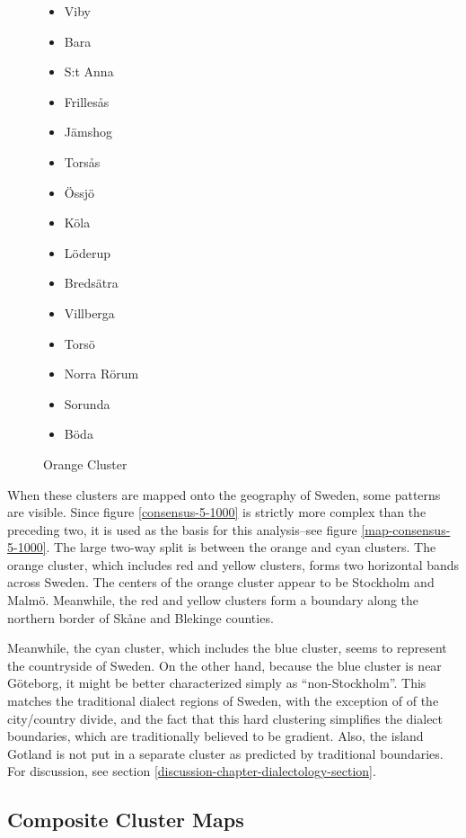 \begin{figure}
\begin{itemize}
\item Viby
\item Bara
\item S:t Anna
\item Frilles\aa{}s
\item J\"amshog
\item Tors\aa{}s
\item \"Ossj\"o
\item K\"ola
\item L\"oderup
\item Breds\"atra
\item Villberga
\item Tors\"o
\item Norra R\"orum
\item Sorunda
\item B\"oda
\end{itemize}
\caption{Orange Cluster}
\label{orange-cluster}
\end{figure}

When these clusters are mapped onto the geography of Sweden, some
patterns are visible. Since figure \ref{consensus-5-1000} is strictly
more complex than the preceding two, it is used as the basis for this
analysis--see figure \ref{map-consensus-5-1000}. The large two-way split
is between the orange and cyan clusters. The orange cluster, which
includes red and yellow clusters, forms two horizontal bands across
Sweden. The centers of the orange cluster appear to be Stockholm and
Malm\"o. Meanwhile, the red and yellow clusters form a boundary along
the northern border of Sk\aa{}ne and Blekinge counties.

Meanwhile, the cyan cluster, which includes the blue cluster, seems to
represent the countryside of Sweden. On the other hand, because the
blue cluster is near G\"oteborg, it might be better characterized
simply as ``non-Stockholm''. This matches the traditional dialect
regions of Sweden, with the exception of of the city/country divide,
and the fact that this hard clustering simplifies the dialect
boundaries, which are traditionally believed to be gradient. Also, the
island Gotland is not put in a separate cluster as predicted by
traditional boundaries. For discussion, see section
\ref{discussion-chapter-dialectology-section}.


\subsection{Composite Cluster Maps}
\label{section-composite-cluster}


